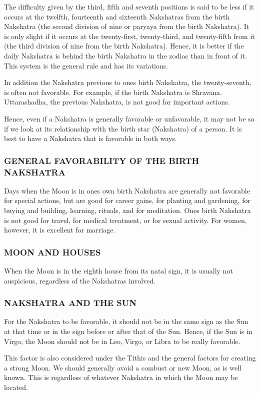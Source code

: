 The difficulty given by the third, fifth and seventh positions is said to be less if it occurs at the twelfth, fourteenth and sixteenth Nakshatras from the birth Nakshatra (the second division of nine or paryaya from the birth Nakshatra). It is only slight if it occurs at the twenty-first, twenty-third, and twenty-fifth from it (the third division of nine from the birth Nakshatra). Hence, it is better if the daily Nakshatra is behind the birth Nakshatra in the zodiac than in front of it. This system is the general rule and has its variations.

In addition the Nakshatra previous to ones birth Nakshatra, the twenty-seventh, is often not favorable. For example, if the birth Nakshatra is Shravana. Uttarashadha, the previous Nakshatra, is not good for important actions.

Hence, even if a Nakshatra is generally favorable or unfavorable, it may not be so if we look at its relationship with the birth star (Nakshatra) of a person. It is best to have a Nakshatra that is favorable in both ways.

 

\subsubsection{GENERAL FAVORABILITY OF THE BIRTH NAKSHATRA}

 

Days when the Moon is in ones own birth Nakshatra are generally not favorable for special actions, but are good for career gains, for planting and gardening, for buying and building, learning, rituals, and for meditation. Ones birth Nakshatra is not good for travel, for medical treatment, or for sexual activity. For women, however, it is excellent for marriage.

 

\subsubsection{MOON AND HOUSES}

When the Moon is in the eighth house from its natal sign, it is usually not auspicious, regardless of the Nakshatras involved.

 

\subsubsection{NAKSHATRA AND THE SUN}

For the Nakshatra to be favorable, it should not be in the same sign as the Sun at that time or in the sign before or after that of the Sun. Hence, if the Sun is in Virgo, the Moon should not be in Leo, Virgo, or Libra to be really favorable.

This factor is also considered under the Tithis and the general factors for creating a strong Moon. We should generally avoid a combust or new Moon, as is well known. This is regardless of whatever Nakshatra in which the Moon may be located.